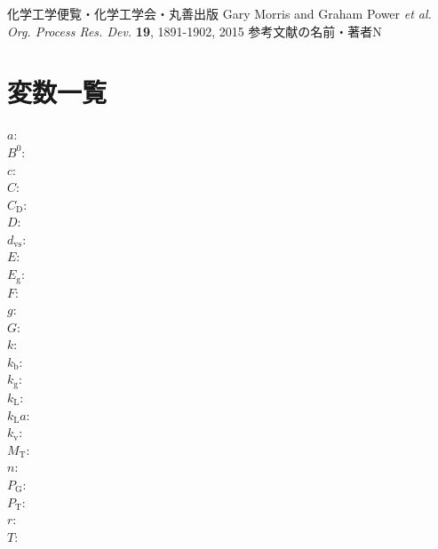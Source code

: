 \documentclass[a4j]{jsreport}
\begin{document}
\newpage
\newpage

\begin{thebibliography}{10}
     化学工学便覧・化学工学会・丸善出版
     Gary Morris and  Graham Power \textit{et al.  Org. Process Res. Dev.} \textbf{19}, 1891-1902, 2015
     参考文献の名前・著者N
\end{thebibliography}

\newpage
\chapter*{変数一覧}
\begin{multicols}{2}
\begin{flushleft}
    $a$: \\
    $B^0$:\\
    $c$:\\
    $C$:\\
    $C_{\mathrm{D}}$:\\
    $D$:\\
    $d_{\mathrm{vs}}$:\\
    $E$:\\
    $E_{\mathrm{g}}$:\\
    $F$:\\
    $g$:\\
    $G$:\\
    $k$:\\
    $k_{\mathrm{b}}$:\\
    $k_{\mathrm{g}}$:\\
    $k_{\mathrm{L}}$:\\
    $k_{\mathrm{L}}a$:\\
    $k_{\mathrm{v}}$:\\
    $M_{\mathrm{T}}$:\\
    $n$:\\
    $P_{\mathrm{G}}$:\\
    $P_{\mathrm{T}}$:\text{}\\
    $r$:\\
    $T$:\\

\end{flushleft}
\end{multicols}
\end{document}
